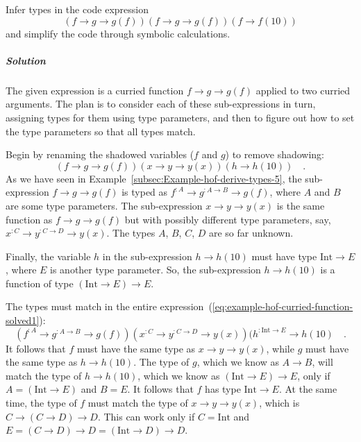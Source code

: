 Infer types in the code expression
\[
\left(f\rightarrow g\rightarrow g(f)\right)\left(f\rightarrow g\rightarrow g(f)\right)\left(f\rightarrow f(10)\right)
\]
and simplify the code through symbolic calculations.

\subparagraph{Solution}

The given expression is a curried function $f\rightarrow g\rightarrow g(f)$
applied to two curried arguments. The plan is to consider each of
these sub-expressions in turn, assigning types for them using type
parameters, and then to figure out how to set the type parameters
so that all types match.

Begin by renaming the shadowed variables ($f$ and $g$) to remove
shadowing:
\begin{equation}
\left(f\rightarrow g\rightarrow g(f)\right)\left(x\rightarrow y\rightarrow y(x)\right)\left(h\rightarrow h(10)\right)\quad.\label{eq:example-hof-curried-function-solved1}
\end{equation}
 As we have seen in Example~\ref{subsec:Example-hof-derive-types-5},
the sub-expression $f\rightarrow g\rightarrow g(f)$ is typed as $f^{:A}\rightarrow g^{:A\rightarrow B}\rightarrow g(f)$,
where $A$ and $B$ are some type parameters. The sub-expression $x\rightarrow y\rightarrow y(x)$
is the same function as $f\rightarrow g\rightarrow g(f)$ but with
possibly different type parameters, say, $x^{:C}\rightarrow y^{:C\rightarrow D}\rightarrow y(x)$.
The types $A$, $B$, $C$, $D$ are so far unknown.

Finally, the variable $h$ in the sub-expression $h\rightarrow h(10)$
must have type $\text{Int}\rightarrow E$, where $E$ is another type
parameter. So, the sub-expression $h\rightarrow h(10)$ is a function
of type $\left(\text{Int}\rightarrow E\right)\rightarrow E$.

The types must match in the entire expression~(\ref{eq:example-hof-curried-function-solved1}):
\begin{equation}
(f^{:A}\rightarrow g^{:A\rightarrow B}\rightarrow g(f))(x^{:C}\rightarrow y^{:C\rightarrow D}\rightarrow y(x))(h^{:\text{Int}\rightarrow E}\rightarrow h(10)\quad.\label{eq:example-hof-curried-function-solved2}
\end{equation}
It follows that $f$ must have the same type as $x\rightarrow y\rightarrow y(x)$,
while $g$ must have the same type as $h\rightarrow h(10)$. The type
of $g$, which we know as $A\rightarrow B$, will match the type of
$h\rightarrow h(10)$, which we know as $\left(\text{Int}\rightarrow E\right)\rightarrow E$,
only if $A=\left(\text{Int}\rightarrow E\right)$ and $B=E$. It follows
that $f$ has type $\text{Int}\rightarrow E$. At the same time, the
type of $f$ must match the type of $x\rightarrow y\rightarrow y(x)$,
which is $C\rightarrow(C\rightarrow D)\rightarrow D$. This can work
only if $C=\text{Int}$ and $E=(C\rightarrow D)\rightarrow D=(\text{Int}\rightarrow D)\rightarrow D$.

